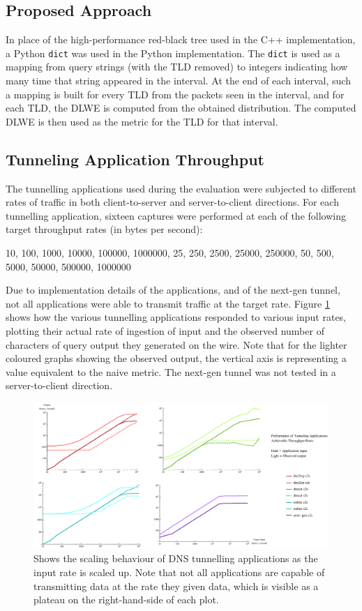 \documentclass[12pt]{report}
\theoremstyle{remark}
\theoremstyle{definition}
\theoremstyle{definition}
\theoremstyle{definition}
\begin{document}
\subsection{Proposed Approach}
\label{proposed-method-python}
In place of the high-performance red-black tree used in the C++ implementation,
a Python \texttt{dict} was used in the Python implementation. The \texttt{dict}
is used as a mapping from query strings (with the TLD removed) to integers
indicating how many time that string appeared in the interval. At the end of
each interval, such a mapping is built for every TLD from the packets seen in
the interval, and for each TLD, the DLWE is computed from the obtained
distribution. The computed DLWE is then used as the metric for the TLD for that
interval.

\subsection{Tunneling Application Throughput}
\label{tunapptp}
The tunnelling applications used during the evaluation were subjected to
different rates of traffic in both client-to-server and server-to-client
directions. For each tunnelling application, sixteen captures were performed at
each of the following target throughput rates (in bytes per second):

10, 100, 1000, 10000, 100000, 1000000, 25, 250, 2500, 25000, 250000, 50, 500,
5000, 50000, 500000, 1000000

Due to implementation details of the applications, and of the next-gen tunnel,
not all applications were able to transmit traffic at the target rate. Figure
\ref{tunrates} shows how the various tunnelling applications responded to
various input rates, plotting their actual rate of ingestion of input and the
observed number of characters of query output they generated on the wire. Note
that for the lighter coloured graphs showing the observed output, the vertical
axis is representing a value equivalent to the naive metric. The next-gen tunnel
was not tested in a server-to-client direction.

\begin{figure}
\centering
\includegraphics[width=\textwidth]{figures/tunrates.pdf}
\caption[DNS Tunneling Application Throughput Scaling]{Shows the scaling
behaviour of DNS tunnelling applications as the input rate is scaled up. Note
that not all applications are capable of transmitting data at the rate they
given data, which is visible as a plateau on the right-hand-side of each plot.}
\label{tunrates}
\end{figure}
\end{document}
